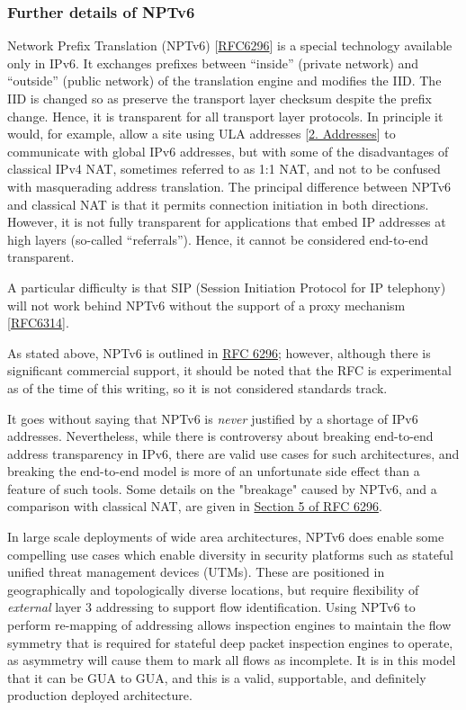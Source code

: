 \documentclass[
]{article}
\begin{document}
\subsubsection{Further details of NPTv6}\label{further-details-of-nptv6}

Network Prefix Translation (NPTv6)
{[}\href{https://www.rfc-editor.org/info/rfc6296}{RFC6296}{]} is a
special technology available only in IPv6. It exchanges prefixes between
``inside'' (private network) and ``outside'' (public network) of the
translation engine and modifies the IID. The IID is changed so as
preserve the transport layer checksum despite the prefix change. Hence,
it is transparent for all transport layer protocols. In principle it
would, for example, allow a site using ULA addresses
{[}\hyperref[addresses]{2. Addresses}{]} to communicate with global IPv6
addresses, but with some of the disadvantages of classical IPv4 NAT,
sometimes referred to as 1:1 NAT, and not to be confused with
masquerading address translation. The principal difference between NPTv6
and classical NAT is that it permits connection initiation in both
directions. However, it is not fully transparent for applications that
embed IP addresses at high layers (so-called ``referrals''). Hence, it
cannot be considered end-to-end transparent.

A particular difficulty is that SIP (Session Initiation Protocol for IP
telephony) will not work behind NPTv6 without the support of a proxy
mechanism {[}\href{https://www.rfc-editor.org/info/rfc6314}{RFC6314}{]}.

As stated above, NPTv6 is outlined in
\href{https://www.rfc-editor.org/info/rfc6296}{RFC 6296}; however,
although there is significant commercial support, it should be noted
that the RFC is experimental as of the time of this writing, so it is
not considered standards track.

It goes without saying that NPTv6 is \emph{never} justified by a
shortage of IPv6 addresses. Nevertheless, while there is controversy
about breaking end-to-end address transparency in IPv6, there are valid
use cases for such architectures, and breaking the end-to-end model is
more of an unfortunate side effect than a feature of such tools. Some
details on the "breakage" caused by NPTv6, and a comparison with
classical NAT, are given in
\href{https://www.rfc-editor.org/rfc/rfc6296.html\#section-5}{Section 5
of RFC 6296}.

In large scale deployments of wide area architectures, NPTv6 does enable
some compelling use cases which enable diversity in security platforms
such as stateful unified threat management devices (UTMs). These are
positioned in geographically and topologically diverse locations, but
require flexibility of \emph{external} layer 3 addressing to support
flow identification. Using NPTv6 to perform re-mapping of addressing
allows inspection engines to maintain the flow symmetry that is required
for stateful deep packet inspection engines to operate, as asymmetry
will cause them to mark all flows as incomplete. It is in this model
that it can be GUA to GUA, and this is a valid, supportable, and
definitely production deployed architecture.
\end{document}
